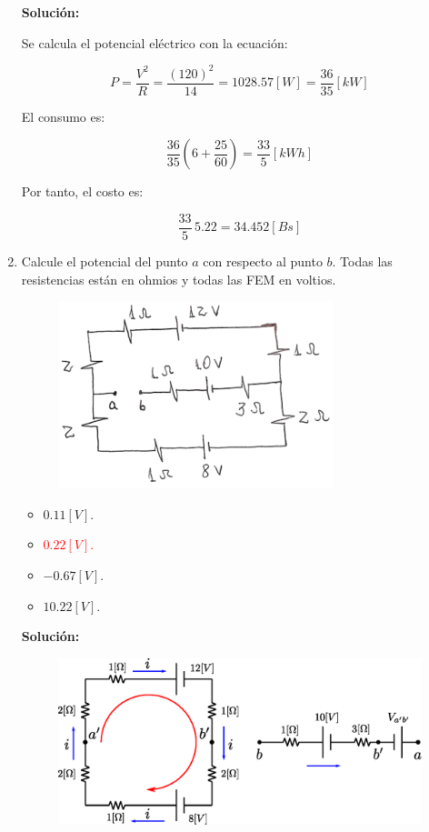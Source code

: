 \documentclass[letter,11pt]{article}
\begin{document}
\begin{enumerate}
\textbf{Solución:}

Se calcula el potencial eléctrico con la ecuación:

\begin{equation*}
    P = \frac{V^2}{R} = \frac{(120)^2}{14} = 1028.57 [W] = \frac{36}{35} [kW]
\end{equation*}

El consumo es:

\begin{equation*}
    \frac{36}{35} \left(6+\frac{25}{60}\right) = \frac{33}{5} [kWh]
\end{equation*}

Por tanto, el costo es:

\begin{equation*}
    \frac{33}{5}\,5.22 = 34.452 [Bs]
\end{equation*}

\item Calcule el potencial del punto $a$ con respecto al punto $b$. Todas las
resistencias están en ohmios y todas las FEM en voltios.

\begin{figure}[!h]
\centering
\includegraphics[scale=1.80]{resources/q7.eps}
\end{figure}

\begin{itemize}
    \item $ 0.11 [V]$.
    \item \textcolor{red}{$ 0.22 [V]$.}
    \item $-0.67 [V]$.
    \item $10.22 [V]$.
\end{itemize}

\textbf{Solución:}

\begin{figure}[!h]
\centering
\includegraphics[scale=0.64]{resources/a7.eps}
\end{figure}


\end{enumerate}
\end{document}
